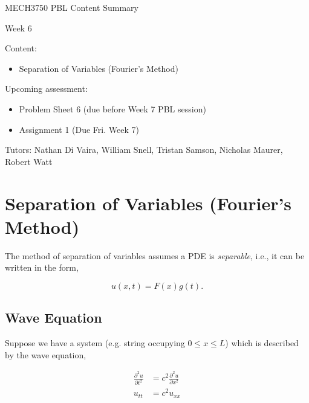 \documentclass[12pt]{article}
\begin{document}
\begin{center}
{\Huge   MECH3750 PBL Content Summary}

\vspace{6mm}

{\Huge  Week 6}

\end{center}

\vspace{6mm}

{\Large Content:}
{\begin{itemize}
	\item Separation of Variables (Fourier's Method)
\end{itemize}}

\vspace{4mm}

{\Large Upcoming assessment:}
{\begin{itemize}
	\item Problem Sheet 6 (due before Week 7 PBL session)
	\item Assignment 1 (Due Fri. Week 7)
\end{itemize}}

\vspace{4mm}

{Tutors: Nathan Di Vaira, William Snell, Tristan Samson, Nicholas Maurer, Robert Watt}


\pagebreak


\section{Separation of Variables (Fourier's Method)}

The method of separation of variables assumes a PDE is \textit{separable}, i.e., it can be written in the form, 

$$u(x,t) = F(x)g(t).$$

\subsection{Wave Equation}

Suppose we have a system (e.g. string occupying $0 \leq x \leq L$) which is described by the wave equation,

\begin{align*}
\frac{\partial^2u}{\partial t^2} &= c^2 \frac{\partial^2u}{\partial x^2}  \\[0.5em]
u_{tt} &= c^2u_{xx}
\end{align*}
\end{document}
